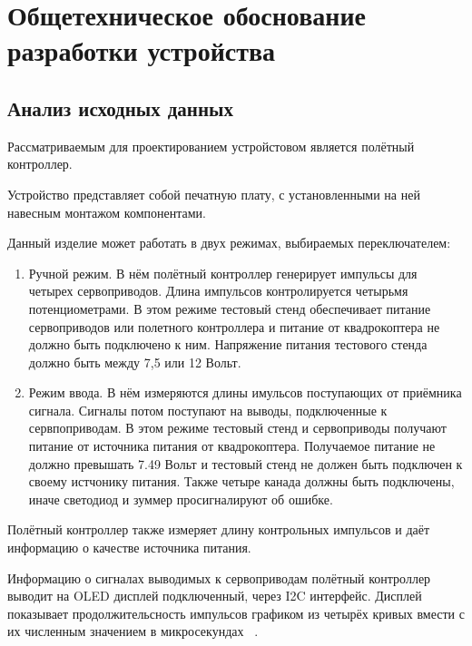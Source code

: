 \section{Общетехническое обоснование разработки устройства}


\subsection{Анализ исходных данных}

Рассматриваемым для проектированием устройстовом является полётный
контроллер.

Устройство представляет собой печатную плату, с установленными на ней
навесным монтажом компонентами.


Данный изделие может работать в двух режимах, выбираемых
переключателем:

\begin{enumerate} 
  
\item Ручной режим. В нём полётный контроллер генерирует импульсы для
четырех сервоприводов. Длина импульсов контролируется четырьмя
потенциометрами. В этом режиме тестовый стенд обеспечивает питание
сервоприводов или полетного контроллера и питание от квадрокоптера не
должно быть подключено к ним. Напряжение питания тестового стенда
должно быть между 7,5 или 12 Вольт.
  
\item Режим ввода. В нём измеряются длины имульсов поступающих от
приёмника сигнала. Сигналы потом поступают на выводы, подключенные к
сервпоприводам.  В этом режиме тестовый стенд и сервоприводы получают
питание от источника питания от квадрокоптера. Получаемое питание не
должно превышать 7.49 Вольт и тестовый стенд не должен быть подключен
к своему истчонику питания. Также четыре канада должны быть
подключены, иначе светодиод и зуммер просигналируют об ошибке.

\end{enumerate}

Полётный контроллер также измеряет длину контрольных импульсов и даёт
информацию о качестве источника питания.

Информацию о сигналах выводимых к сервоприводам полётный контроллер
выводит на OLED дисплей подключенный, через I2C интерфейс.  Дисплей
показывает продолжительсность импульсов графиком из четырёх кривых
вмести с их численным значением в микросекундах
~\cite{Elector521}.

